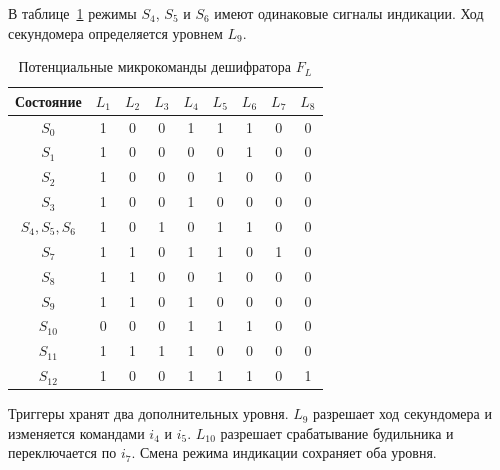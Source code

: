 В таблице~\ref{tab:clock-levels} режимы $S_4$, $S_5$ и $S_6$ имеют одинаковые сигналы индикации. Ход секундомера определяется уровнем $L_9$.

\begin{table}[H]
	\centering
	\caption{Потенциальные микрокоманды дешифратора $F_L$}
	\label{tab:clock-levels}
	\small{}
	\renewcommand{\arraystretch}{1.12}
	\setlength{\tabcolsep}{9pt}
	\begin{tabular}{|c|c|cc|ccc|cc|}
		\hline
		Состояние & $L_1$ & $L_2$ & $L_3$ & $L_4$ & $L_5$ & $L_6$ & $L_7$ & $L_8$ \\
		\hline
		$S_0$          & 1 & 0 & 0 & 1 & 1 & 1 & 0 & 0 \\
		$S_1$          & 1 & 0 & 0 & 0 & 0 & 1 & 0 & 0 \\
		$S_2$          & 1 & 0 & 0 & 0 & 1 & 0 & 0 & 0 \\
		$S_3$          & 1 & 0 & 0 & 1 & 0 & 0 & 0 & 0 \\
		$S_4,S_5,S_6$  & 1 & 0 & 1 & 0 & 1 & 1 & 0 & 0 \\
		$S_7$          & 1 & 1 & 0 & 1 & 1 & 0 & 1 & 0 \\
		$S_8$          & 1 & 1 & 0 & 0 & 1 & 0 & 0 & 0 \\
		$S_9$          & 1 & 1 & 0 & 1 & 0 & 0 & 0 & 0 \\
		$S_{10}$       & 0 & 0 & 0 & 1 & 1 & 1 & 0 & 0 \\
		$S_{11}$       & 1 & 1 & 1 & 1 & 0 & 0 & 0 & 0 \\
		$S_{12}$       & 1 & 0 & 0 & 1 & 1 & 1 & 0 & 1 \\
		\hline
	\end{tabular}
\end{table}

Триггеры хранят два дополнительных уровня. $L_9$ разрешает ход секундомера и изменяется командами $i_4$ и $i_5$. $L_{10}$ разрешает срабатывание будильника и переключается по $i_7$. Смена режима индикации сохраняет оба уровня.
